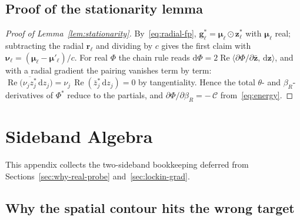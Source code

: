 \documentclass[11pt]{article}
\newcommand{\dd}{\mathrm{d}}
\theoremstyle{definition}
\DeclareMathOperator{\Real}{Re}
\begin{document}
\subsection*{Proof of the stationarity lemma}

\begin{proof}[Proof of Lemma~\ref{lem:stationarity}]
By~\eqref{eq:radial-fp}, $\bm{g}^*_\ell = \bm{\mu}_\ell\odot\bm{z}^*_\ell$
with $\bm{\mu}_\ell$ real; subtracting the radial $\bm{r}_\ell$ and
dividing by $c$ gives the first claim with
$\bm{\nu}_\ell = (\bm{\mu}_\ell-\bm{\mu}'_\ell)/c$.  For real $\Phi$
the chain rule reads $\dd\Phi = 2\Real\langle
\partial\Phi/\partial\bar{\bm{z}},\,\dd\bm{z}\rangle$, and with a
radial gradient the pairing vanishes term by term:
$\Real\bigl(\overline{\nu_j z^*_j}\,\dd z_j\bigr)
= \nu_j\,\Real(\bar z^*_j\,\dd z_j) = 0$ by tangentiality.  Hence the
total $\theta$- and $\beta_R$-derivatives of $\Phi^*$ reduce to the
partials, and $\partial\Phi/\partial\beta_R = -\,\mathcal{C}$
from~\eqref{eq:energy}.
\end{proof}

\section{Sideband Algebra}\label{app:sidebands}

This appendix collects the two-sideband bookkeeping deferred from
Sections~\ref{sec:why-real-probe} and~\ref{sec:lockin-grad}.

\subsection*{Why the spatial contour hits the wrong target}
\end{document}
